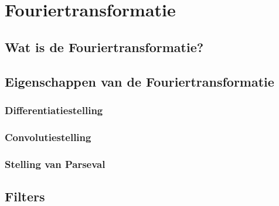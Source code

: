 \chapter{Fouriertransformatie}
\label{ch:fourier_transformatie}


\section{Wat is de Fouriertransformatie?}

\section{Eigenschappen van de Fouriertransformatie}

\subsection{Differentiatiestelling}

\subsection{Convolutiestelling}

\subsection{Stelling van Parseval}

\section{Filters}

